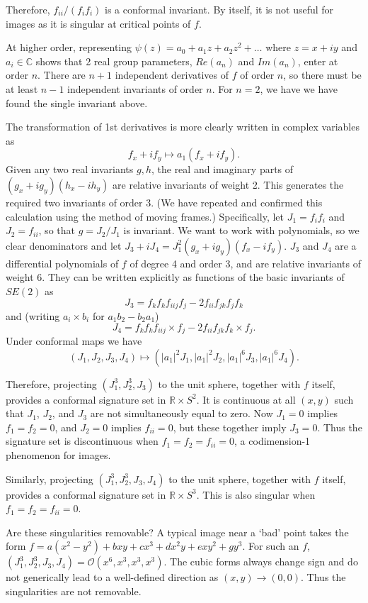 \documentclass{article}
\def\R{\mathbb{R}}
\begin{document}
Therefore, $f_{ii}/(f_i f_i)$ is a conformal invariant. By itself, it is not useful for images as it is singular at critical points of $f$.

At higher order,  representing $\psi(z) = a_0 + a_1 z + a_2 z^2 + \dots$ where $z=x+iy$ and $a_i\in \mathbb{C}$ shows that
2 real group parameters, $Re(a_n)$ and $Im(a_n)$, enter at order $n$. There are $n+1$ independent derivatives of $f$ of order $n$, 
so there must be at least $n-1$ independent invariants of order $n$. For $n=2$, we have we have found the single invariant above.

The transformation of 1st derivatives is more clearly written in complex variables as
$$ f_x + i f_y \mapsto a_1 (f_x + i f_y).$$
Given any two real invariants $g,h$, the real and imaginary parts of $(g_x+i g_y)(h_x-i h_y)$ are
relative invariants of weight 2. This generates the required two invariants of order 3. (We have
repeated and confirmed this calculation using the method of moving frames.)
Specifically, let $J_1 = f_i f_i$ and  $J_2 = f_{ii}$, so that  $g = J_2/J_1$ is invariant.
We want to work with polynomials, so we clear denominators and
let $J_3+iJ_4 = J_1^2 (g_x + i g_y)  (f_x - i f_y)$. $J_3$ and $J_4$ are a differential polynomials of $f$
of degree 4 and order 3, and are relative invariants of weight 6. They can be written explicitly as functions
of the basic invariants of $SE(2)$ as
$$J_3 = f_k f_k f_{iij}f_j - 2 f_{ii} f_{jk} f_j f_k$$
and (writing $a_i\times b_i$ for $a_1 b_2 - b_2 a_1$)
$$ J_4 = f_k f_k f_{iij}\times f_j - 2 f_{ii} f_{jk} f_k\times f_j.$$
Under conformal maps we have
$$ (J_1,J_2,J_3,J_4) \mapsto (|a_1|^2 J_1, |a_1|^2 J_2, |a_1|^6 J_3,|a_1|^6 J_4).$$

Therefore, projecting $(J_1^3,J_2^3,J_3)$ to the unit sphere, together with $f$ itself, provides a conformal signature set in $\R\times S^2$. It is continuous at all $(x,y)$ such that
$J_1$, $J_2$, and $J_3$ are not simultaneously equal to zero. 
Now $J_1=0$ implies $f_1=f_2=0$, and $J_2=0$ implies $f_{ii}=0$, but these together
imply $J_3=0$. Thus the signature set is discontinuous when 
 $f_1=f_2=f_{ii}=0$, a codimension-1 phenomenon for images.

Similarly,
projecting $(J_1^3,J_2^3,J_3,J_4)$ to the unit sphere, together with $f$ itself, provides a conformal signature set in $\R\times S^3$. This is also singular when $f_1=f_2=f_{ii}=0$.

Are these singularities removable? A typical image near a `bad' point takes
the form $f = a(x^2-y^2) + b x y + c x^3 + d x^2 y + e x y^2 + g y^3$.
For such an $f$, $(J_1^3,J_2^3,J_3,J_4)=\mathcal{O}(x^6,x^3,x^3,x^3)$.
The cubic forms always change sign and do not generically lead to a well-defined direction
as $(x,y)\to(0,0)$. Thus the singularities are not removable.
\end{document}
